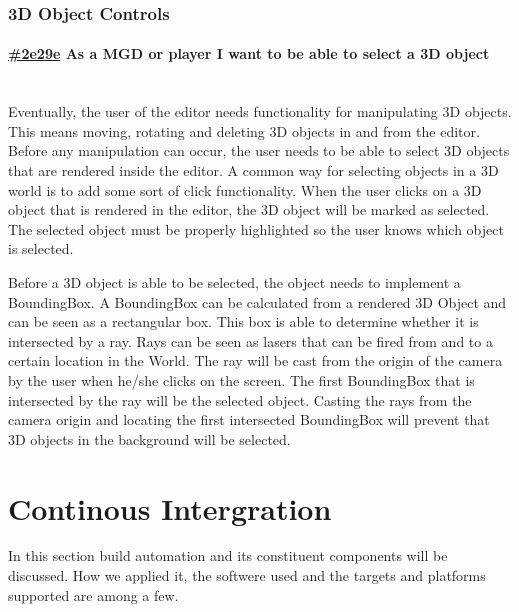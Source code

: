 \documentclass[10pt]{extarticle} %
\newcommand{\myparagraph}[1]{\paragraph{#1}\mbox{}\\} %
\begin{document}
    \subsubsection{3D Object Controls}
    \myparagraph{\href{\clickup{2e29e}}{\#2e29e} As a MGD or player I want to be able to select a 3D object}
    Eventually, the user of the editor needs functionality for manipulating 3D objects.
    This means moving, rotating and deleting 3D objects in and from the editor.
    Before any manipulation can occur, the user needs to be able to select 3D objects that are rendered inside the editor.
    A common way for selecting objects in a 3D world is to add some sort of click functionality.
    When the user clicks on a 3D object that is rendered in the editor, the 3D object will be marked as selected.
    The selected object must be properly highlighted so the user knows which object is selected.

    Before a 3D object is able to be selected, the object needs to implement a BoundingBox.
    A BoundingBox can be calculated from a rendered 3D Object and can be seen as a rectangular box.
    This box is able to determine whether it is intersected by a ray.
    Rays can be seen as lasers that can be fired from and to a certain location in the World.
    The ray will be cast from the origin of the camera by the user when he/she clicks on the screen.
    The first BoundingBox that is intersected by the ray will be the selected object.
    Casting the rays from the camera origin and locating the first intersected BoundingBox will prevent that 3D objects in the background will be selected.

    \newpage
    \section{Continous Intergration}
    In this section build automation and its constituent components will be discussed.
    How we applied it, the softwere used and the targets and platforms supported are among a few.

    \newpage
    
\end{document}
